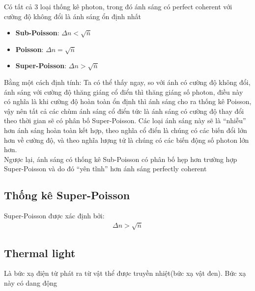 \documentclass{report}
\newcommand{\q}[1]{``#1''
}
\begin{document}
Có tất cả 3 loại thống kê photon, trong đó ánh sáng có perfect coherent với cường độ không đổi là ánh sáng ổn định nhất
\begin{itemize}
	\item \textbf{Sub-Poisson}: $\Delta n < \sqrt{\overline{n}}$
	\item \textbf{Poisson}: $\Delta n = \sqrt{\overline{n}}$
	\item \textbf{Super-Poisson}: $\Delta n > \sqrt{\overline{n}}$
\end{itemize}
Bằng một cách định tính: Ta có thể thấy ngay, so với ánh có cường độ không đổi, ánh sáng với cường độ thăng giáng cổ điển thì thăng giáng số photon, điều này có nghĩa là khi cường độ hoàn toàn ổn định thì ánh sáng cho ra thống kê Poisson, vậy nên tất cả các chùm ánh sáng cổ điển tức là ánh sáng có cường độ thay đổi theo thời gian sẽ có phân bố Super-Poisson. Các loại ánh sáng này sẽ là \q{nhiễu} hơn ánh sáng hoàn toàn kết hợp, theo nghĩa cổ điển là chúng có các biến đổi lớn hơn về cường độ, và theo nghĩa lượng tử là chúng có các biến động số photon lớn hơn.\\
Ngược lại, ánh sáng có thống kê Sub-Poisson có phân bố hẹp hơn trường hợp Super-Poisson và do đó \q{yên tĩnh} hơn ánh sáng perfectly coherent
\subsection{Thống kê Super-Poisson}
Super-Poisson được xác định bởi:
\begin{gather}
	\Delta n > \sqrt{\overline{n}}
\end{gather}
\subsection{Thermal light}
Là bức xạ điện từ phát ra từ vật thể được truyền nhiệt(bức xạ vật đen). Bức xạ này có dang động
\end{document}
